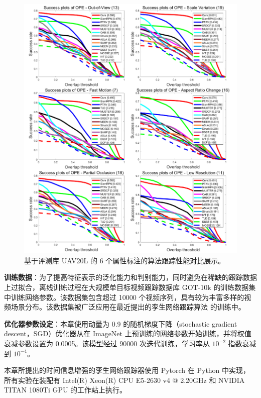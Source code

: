 \begin{figure}[t!]
    \centering
    \includegraphics[width=1.0\textwidth]{Img/end/UAV20L_2.pdf}
    \caption{基于评测库 UAV20L \cite{mueller2016benchmark} 的 6 个属性标注的算法跟踪性能对比展示。}
    \label{fig:end_uav20l_attr_2}
\end{figure}

\textbf{训练数据}：为了提高特征表示的泛化能力和判别能力，同时避免在稀缺的跟踪数据上过拟合，离线训练过程在大规模单目标视频跟踪数据库 GOT-10k \cite{GOT-10k} 的训练数据集中训练网络参数。该数据集包含超过 10000 个视频序列，具有较为丰富多样的视频场景分布。该数据集被广泛应用在最近提出的孪生网络跟踪算法 \cite{SiamFC++} 的训练中。

\textbf{优化器参数设定}：本章使用动量为 0.9 的随机梯度下降（stochastic gradient descent，SGD）优化器从在 ImageNet 上预训练的网络参数开始训练，并将权值衰减参数设置为 0.0005。该模型经过 90000 次迭代训练，学习率从 $10^{-2}$ 指数衰减到 $10^{-4}$。

本章所提出的时间信息增强的孪生网络跟踪器使用 Pytorch 在 Python 中实现，所有实验在装配有 Intel(R) Xeon(R) CPU E5-2630 v4 @ 2.20GHz 和 NVIDIA TITAN 1080Ti GPU 的工作站上执行。

